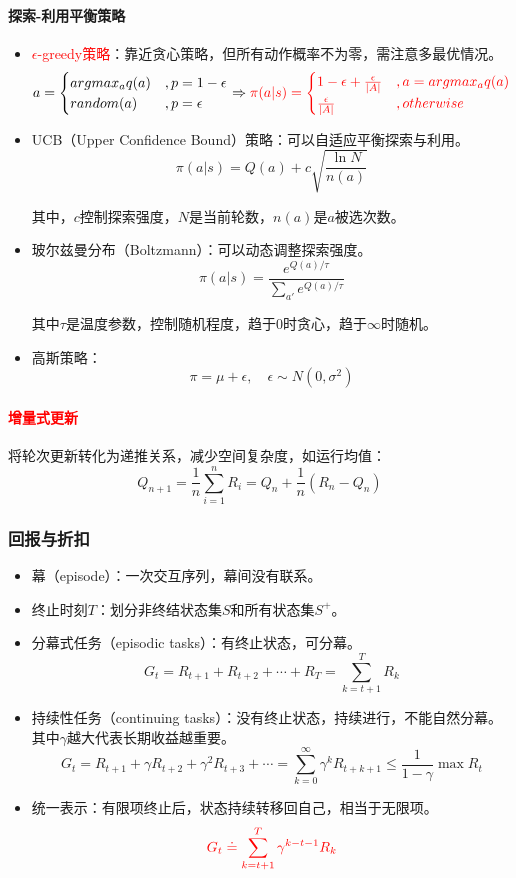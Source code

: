 \documentclass[
12pt, %
a4paper, 
oneside, %
]{scrartcl}
\begin{document}
\paragraph{探索-利用平衡策略}
\begin{itemize}
\item \textcolor{red}{$ \epsilon $-greedy策略}：靠近贪心策略，但所有动作概率不为零，需注意多最优情况。
$$ a = \begin{cases} argmax_a q(a) &, p = 1 - \epsilon \\ random(a) &, p = \epsilon \end{cases} \Rightarrow \textcolor{red}{\pi(a|s) = \begin{cases} 1 - \epsilon + \frac{\epsilon}{|A|} &, a = argmax_a q(a) \\ \frac{\epsilon}{|A|} &, otherwise \end{cases}} $$
\item UCB（Upper Confidence Bound）策略：可以自适应平衡探索与利用。
$$ \pi(a|s) = Q(a) + c\sqrt{\frac{\ln N}{n(a)}} $$

其中，$ c $控制探索强度，$ N $是当前轮数，$ n(a) $是$ a $被选次数。
\item 玻尔兹曼分布（Boltzmann）：可以动态调整探索强度。
$$ \pi(a|s) = \frac{e^{Q(a)/\tau}}{\sum_{a'} e^{Q(a)/\tau}} $$

其中$ \tau $是温度参数，控制随机程度，趋于$ 0 $时贪心，趋于$ \infty $时随机。
\item 高斯策略：
$$ \pi = \mu + \epsilon, \quad \epsilon \sim N(0, \sigma^2) $$
\end{itemize}
\paragraph{\textcolor{red}{增量式更新}}
将轮次更新转化为递推关系，减少空间复杂度，如运行均值：
$$ Q_{n + 1} = \frac{1}{n}\sum_{i = 1}^n R_i = Q_n + \frac{1}{n}(R_n - Q_n) $$
\subsubsection[回报与折扣]{回报与折扣}
\begin{itemize}
\item 幕（episode）：一次交互序列，幕间没有联系。
\item 终止时刻$ T $：划分非终结状态集$ S $和所有状态集$ S^+ $。
\item 分幕式任务（episodic tasks）：有终止状态，可分幕。
$$ G_t = R_{t + 1} + R_{t + 2} + \cdots + R_T = \sum_{k = t + 1}^T R_k $$
\item 持续性任务（continuing tasks）：没有终止状态，持续进行，不能自然分幕。其中$ \gamma $越大代表长期收益越重要。
$$ G_t = R_{t + 1} + \gamma R_{t + 2} + \gamma^2 R_{t + 3} + \cdots = \sum_{k = 0}^{\infty} \gamma^k R_{t + k + 1} \leq \frac{1}{1 - \gamma} \max R_t $$
\item 统一表示：有限项终止后，状态持续转移回自己，相当于无限项。
$$ \textcolor{red}{G_t \doteq \sum_{k = t + 1}^{T} \gamma^{k - t - 1} R_k} $$
\end{itemize}
\end{document}
